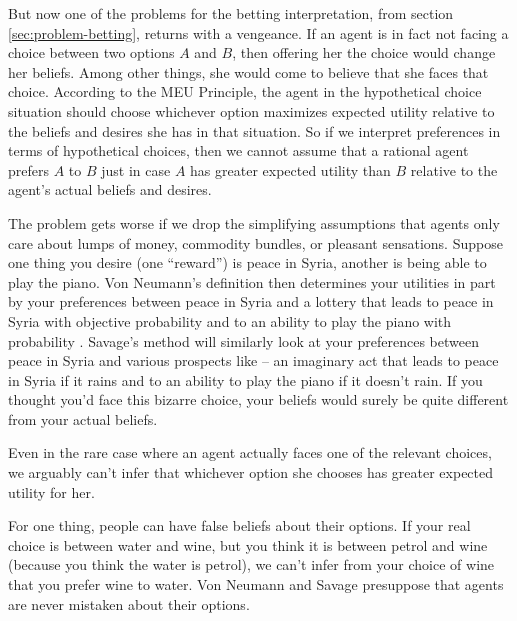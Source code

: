 But now one of the problems for the betting interpretation, from
section \ref{sec:problem-betting}, returns with a vengeance. If an
agent is in fact not facing a choice between two options $A$ and $B$,
then offering her the choice would change her beliefs. Among other
things, she would come to believe that she faces that
choice. According to the MEU Principle, the agent in the hypothetical
choice situation should choose whichever option maximizes expected
utility relative to the beliefs and desires she has in that
situation. So if we interpret preferences in terms of hypothetical
choices, then we cannot assume that a rational agent prefers $A$ to
$B$ just in case $A$ has greater expected utility than $B$ relative to
the agent's actual beliefs and desires.


The problem gets worse if we drop the simplifying assumptions that
agents only care about lumps of money, commodity bundles, or pleasant
sensations. Suppose one thing you desire (one ``reward'') is peace in
Syria, another is being able to play the piano. Von Neumann's
definition then determines your utilities in part by your preferences
between peace in Syria and a lottery that leads to peace in Syria with
objective probability  and to an ability to play the
piano with probability . Savage's method will similarly
look at your preferences between peace in Syria and various prospects
like  -- an imaginary act
that leads to peace in Syria if it rains and to an ability to play the
piano if it doesn't rain. If you thought you'd face this bizarre
choice, your beliefs would surely be quite different from your actual
beliefs.

Even in the rare case where an agent actually faces one of the
relevant choices, we arguably can't infer that whichever option she
chooses has greater expected utility for her. 

For one thing, people can have false beliefs about their options. If
your real choice is between water and wine, but you think it is
between petrol and wine (because you think the water is petrol), we
can't infer from your choice of wine that you prefer wine to water.
Von Neumann and Savage presuppose that agents are never mistaken about
their options.

